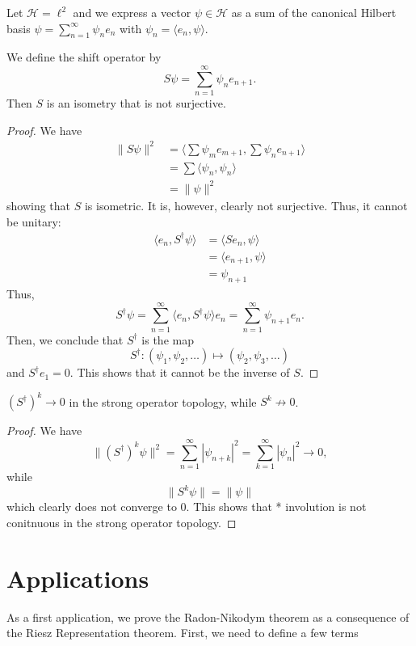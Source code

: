 \documentclass[twoside,symmetric, openany, 12pt]{./tuftebook}
\theoremstyle{definition}
\theoremstyle{definition}
\theoremstyle{definition}
\begin{document}
\begin{Example}
Let $\mathcal{H}=\ell^2$ and we express a vector $\psi\in \mathcal{H}$ as a sum of the canonical Hilbert basis $\psi=\sum_{n=1}^{\infty} \psi_n e_n$ with $\psi_n = \langle e_n, \psi\rangle$.

We define the shift operator by
\[
	S\psi = \sum_{n=1}^{\infty} \psi_n e_{n+1}
.\] 
Then $S$ is an isometry that is not surjective.
\end{Example}
\begin{proof}
	We have
	\begin{align*}
		\|S\psi\|^2 &= \langle \sum \psi_m e_{m+1}, \sum \psi_n e_{n+1}\rangle \\
			    &= \sum \langle \psi_n, \psi_n \rangle\\
			    &= \|\psi\|^2
	\end{align*}
	showing that $S$ is isometric. It is, however, clearly not surjective. Thus, it cannot be unitary:
	\begin{align*}
		\langle e_n, S^\dagger \psi\rangle &= \langle S e_n, \psi\rangle\\
						   &= \langle e_{n+1}, \psi\rangle\\
						   &= \psi_{n+1}
	\end{align*}
	Thus, 
	\[
		S^\dagger \psi = \sum_{n=1}^{\infty} \langle e_n, S^\dagger \psi\rangle e_n = \sum_{n=1}^{\infty} \psi_{n+1} e_n
	.\] 
	Then, we conclude that $S^\dagger$ is the map
	\[
	S^\dagger: (\psi_1, \psi_2, \dots )\mapsto (\psi_2, \psi_3, \dots)
	\]
	and $S^\dagger e_1 = 0$. This shows that it cannot be the inverse of $S$.
\end{proof}
\begin{Proposition}
	$(S^\dagger)^k\to 0$ in the strong operator topology, while $S^k\not\to 0$.
\end{Proposition}
\begin{proof}
	We have
	\[
		\|(S^\dagger)^k \psi\|^2 = \sum_{n=1}^{\infty} |\psi_{n+k}|^2 = \sum_{k=1}^\infty |\psi_n|^2 \to 0
	,\]
	while
	\[
	\|S^k \psi\|= \|\psi\|
\]
which clearly does not converge to 0. This shows that * involution is not conitnuous in the strong operator topology.
\end{proof}
\section{Applications}
As a first application, we prove the Radon-Nikodym theorem as a consequence of the Riesz Representation theorem. First, we need to define a few terms
\end{document}
